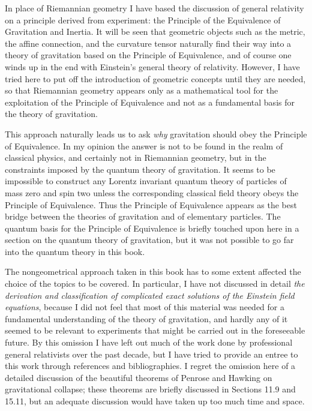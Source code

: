 In place of Riemannian geometry I have based the discussion of general
relativity on a principle derived from experiment: the Principle of the
Equivalence of Gravitation and Inertia. It will be seen that geometric objects
such as the metric, the affine connection, and the curvature tensor naturally
find their way into a theory of gravitation based on the Principle of
Equivalence, and of course one winds up in the end with Einstein's general
theory of relativity. However, I have tried here to put off the introduction of
geometric concepts until they are needed, so that Riemannian geometry appears
only as a mathematical tool for the exploitation of the Principle of
Equivalence and not as a fundamental basis for the theory of gravitation.

This approach naturally leads us to ask \emph{why} gravitation should obey the
Principle of Equivalence. In my opinion the answer is not to be found in the
realm of classical physics, and certainly not in Riemannian geometry, but in
the constraints imposed by the quantum theory of gravitation. It seems to be
impossible to construct any Lorentz invariant quantum theory of particles of
mass zero and spin two unless the corresponding classical field theory obeys
the Principle of Equivalence. Thus the Principle of Equivalence appears as the
best bridge between the theories of gravitation and of elementary particles.
The quantum basis for the Principle of Equivalence is briefly touched upon here
in a section on the quantum theory of gravitation, but it was not possible to
go far into the quantum theory in this book.

The nongeometrical approach taken in this book has to some extent affected the
choice of the topics to be covered. In particular, I have not discussed in
detail \emph{the derivation and classification of complicated exact solutions
of the Einstein field equations}, because I did not feel that most of this
material was needed for a fundamental understanding of the theory of
gravitation, and hardly any of it seemed to be relevant to experiments that
might be carried out in the foreseeable future. By this omission I have left
out much of the work done by professional general relativists over the past
decade, but I have tried to provide an entree to this work through references
and bibliographies. I regret the omission here of a detailed discussion of the
beautiful theorems of Penrose and Hawking on gravitational collapse; these
theorems are briefly discussed in Sections 11.9 and 15.11, but an adequate
discussion would have taken up too much time and space.

